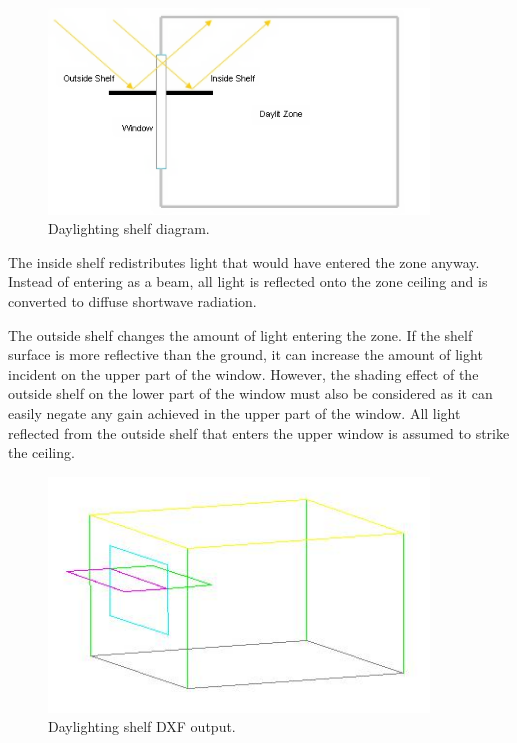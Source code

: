 \begin{figure}[hbtp] %
\centering
\includegraphics[width=0.9\textwidth, height=0.9\textheight, keepaspectratio=true]{media/image110.png}
\caption{Daylighting shelf diagram. \protect \label{fig:daylighting-shelf-diagram.}}
\end{figure}

The inside shelf redistributes light that would have entered the zone anyway. Instead of entering as a beam, all light is reflected onto the zone ceiling and is converted to diffuse shortwave radiation.

The outside shelf changes the amount of light entering the zone. If the shelf surface is more reflective than the ground, it can increase the amount of light incident on the upper part of the window. However, the shading effect of the outside shelf on the lower part of the window must also be considered as it can easily negate any gain achieved in the upper part of the window. All light reflected from the outside shelf that enters the upper window is assumed to strike the ceiling.

\begin{figure}[hbtp] %
\centering
\includegraphics[width=0.9\textwidth, height=0.9\textheight, keepaspectratio=true]{media/image111.png}
\caption{Daylighting shelf DXF output. \protect \label{fig:daylighting-shelf-dxf-output.}}
\end{figure}

